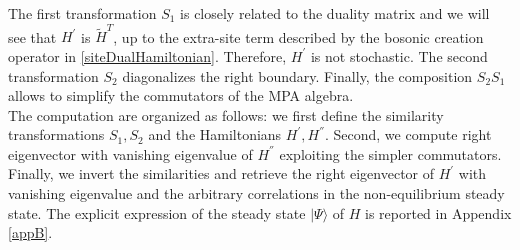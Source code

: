 \documentclass[10pt]{article}
\numberwithin{equation}{section}
\numberwithin{equation}{subsection}
\newcommand{\com}[1]{{ (* {\color{red}\small #1}*)}}
\begin{document}
The first transformation $S_{1}$ is closely related to the duality matrix and we will see that $H^{'}$ is $\widetilde{H}^{T}$, up to the extra-site term described by the bosonic creation operator in \eqref{siteDualHamiltonian}. Therefore, $H^{'}$ is not stochastic. The second transformation $S_{2}$ diagonalizes the right boundary. Finally, the composition  $S_{2} S_{1}$ allows to simplify the commutators of the MPA algebra. \\

The computation are organized as follows: we first define the similarity transformations $S_{1},S_{2}$ and the Hamiltonians $H^{'},H^{''}$. Second, we compute right eigenvector with vanishing eigenvalue of $H^{''}$ exploiting the simpler commutators. Finally, we invert the similarities and retrieve the right eigenvector of $H^{'}$ with vanishing eigenvalue and  the arbitrary correlations in the non-equilibrium steady state. The explicit expression of the steady state $|\Psi\rangle$ of $H$ is reported in Appendix \ref{appB}. 




\begin{comment}
{\color{blue}We aim to find an explicit for for the steady state $|\Psi\rangle$. The MPA gives the steady state in terms of an abstract algebra of operators. If an explicit representation of $(X_{a})_{a=1,\ldots,N}$ was available, it would be possible to compute explicitly all the correlations and currents of particles for the Hamiltonian \eqref{hamiltonian}. Another way of computing this steady state, without passing through a representation, is using the commutators \eqref{bula} and the actions \eqref{leftBoundary} and \eqref{rightBoundary}. For the one and two point correlation and for the currents this has been done in \cite{vanicat2017exact}. Inspired by this last reference, in this subsection, we aim to find exact formulas for the steady state  $|\Psi\rangle$ using only the \eqref{bula}, \eqref{leftBoundary} and \eqref{rightBoundary}. In subsection \ref{correlation-section}, this result will leads to exact correlation for arbitrary number of particles of type $\{2,\ldots,N\}$. This aim will be achieved by the help of a similarity transformation $\mathcal{S}$ that makes commutation relations simpler, and allows to find the steady state $|\widetilde\Psi\rangle$ of a transformed Hamiltonian, denoted  $\mathbb{H}$, with lower-triangular left boundary and diagonal right boundary. Therefore, inverting this similarity, one can retrieve the steady state of \eqref{hamiltonian}. A fundamental 'ingredient' of these computation is duality, that has been proved in section~\ref{sectionDuality}. Indeed, the similarity transformation $\mathcal{S}$ relies on an "intermediate transformation" $V$ (see \eqref{transformationV}) that is, up to the diagonal operator $R$, the duality matrix.} \com{clarify}
\end{comment}
\end{document}
